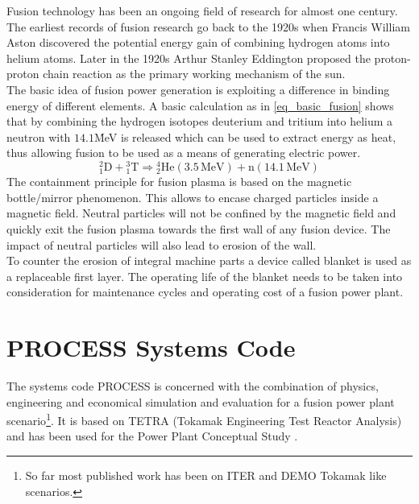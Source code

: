 	Fusion technology has been an ongoing field of research for almost one century. The earliest records of fusion research go back to the 1920s when Francis William Aston discovered the potential energy gain of combining hydrogen atoms into helium atoms. Later in the 1920s Arthur Stanley Eddington proposed the proton-proton chain reaction as the primary working mechanism of the sun.\\
	The basic idea of fusion power generation is exploiting a difference in binding energy of different elements. A basic calculation as in \ref{eq_basic_fusion} shows that by combining the hydrogen isotopes deuterium and tritium into helium a neutron with $14.1$\.MeV is released which can be used to extract energy as heat, thus allowing fusion to be used as a means of generating electric power.
	\begin{equation}
		{}^2_1\textrm{D} + {}^3_1\textrm{T} \Rightarrow {}^4_2\textrm{He} (3.5\,\textrm{MeV}) + \textrm{n} (14.1\,\textrm{MeV})
		\label{eq_basic_fusion}
	\end{equation}
	The containment principle for fusion plasma is based on the magnetic bottle/mirror phenomenon. This allows to encase charged particles inside a magnetic field. Neutral particles will not be confined by the magnetic field and quickly exit the fusion plasma towards the first wall of any fusion device. The impact of neutral particles will also lead to erosion of the wall.\\
	To counter the erosion of integral machine parts a device called blanket is used as a replaceable first layer. The operating life of the blanket needs to be taken into consideration for maintenance cycles and operating cost of a fusion power plant.
	
	\section{PROCESS Systems Code}
	The systems code PROCESS\cite{process} is concerned with the combination of physics, engineering and economical simulation and evaluation for a fusion power plant scenario\footnote{So far most published work has been on ITER and DEMO Tokamak like scenarios.}. It is based on TETRA (Tokamak Engineering Test Reactor Analysis) \cite{TETRA} and has been used for the Power Plant Conceptual Study \cite{PPCS}.\\
	
